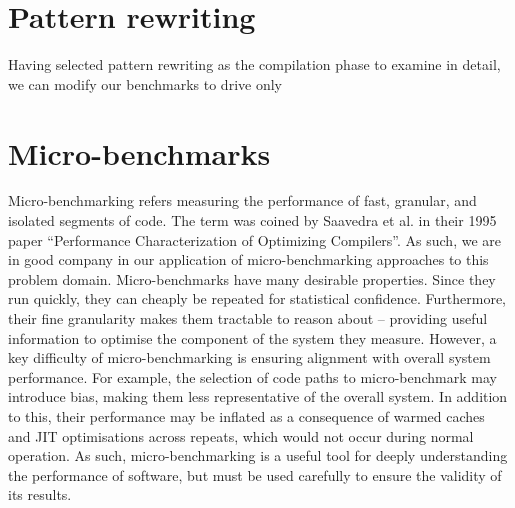 \section{Pattern rewriting}

Having selected pattern rewriting as the compilation phase to examine in detail, we can modify our benchmarks to drive only











\section{Micro-benchmarks}
\label{sec:ubenchmark}

Micro-benchmarking refers measuring the performance of fast, granular, and isolated segments of code.
The term was coined by Saavedra et al. in their 1995 paper \cite{saavedraPerformanceCharacterizationOptimizing1995} ``Performance Characterization of Optimizing Compilers''. As such, we are in good company in our application of micro-benchmarking approaches to this problem domain.
Micro-benchmarks have many desirable properties. Since they run quickly, they can cheaply be repeated for statistical confidence.
Furthermore, their fine granularity makes them tractable to reason about -- providing useful information to optimise the component of the system they measure.
However, a key difficulty of micro-benchmarking is ensuring alignment with overall system performance. For example, the selection of code paths to micro-benchmark may introduce bias, making them less representative of the overall system. In addition to this, their performance may be inflated as a consequence of warmed caches and JIT optimisations across repeats, which would not occur during normal operation.
As such, micro-benchmarking is a useful tool for deeply understanding the performance of software, but must be used carefully to ensure the validity of its results.

